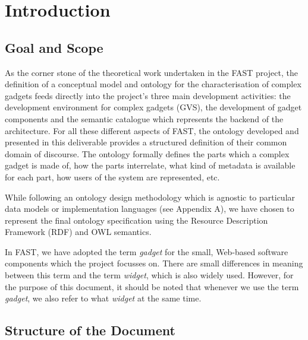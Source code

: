 \documentclass[twoside]{fast_latex}
\begin{document}
\section{Introduction} %
\label{sec:introduction}

\subsection{Goal and Scope} %
\label{sub:goal_and_scope}

As the corner stone of the theoretical work undertaken in the FAST project, the definition of a conceptual model and ontology for the characterisation of complex gadgets feeds directly into the project's three main development activities: the development environment for complex gadgets (GVS), the development of gadget components and the semantic catalogue which represents the backend of the architecture. For all these different aspects of FAST, the ontology developed and presented in this deliverable provides a structured definition of their common domain of discourse. The ontology formally defines the parts which a complex gadget is made of, how the parts interrelate, what kind of metadata is available for each part, how users of the system are represented, etc.

While following an ontology design methodology which is agnostic to particular data models or implementation languages (see Appendix A), we have chosen to represent the final ontology specification using the Resource Description Framework (RDF) and OWL semantics.

In FAST, we have adopted the term \emph{gadget} for the small, Web-based software components which the project focusses on. There are small differences in meaning between this term and the term \emph{widget}, which is also widely used. However, for the purpose of this document, it should be noted that whenever we use the term \emph{gadget}, we also refer to what \emph{widget} at the same time.


\subsection{Structure of the Document} %
\label{sub:structure_of_the_document}
\end{document}
